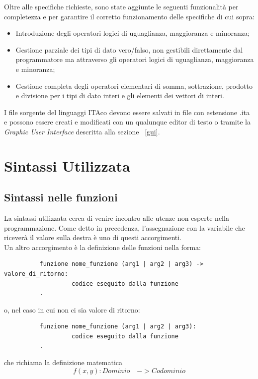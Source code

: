 \documentclass[11pt, a4paper, twoside, notitlepage]{report}
\begin{document}
Oltre alle specifiche richieste, sono state aggiunte le seguenti funzionalità
per completezza e per garantire il corretto funzionamento delle specifiche di
cui sopra:
\begin{itemize}
  \item Introduzione degli operatori logici di uguaglianza, maggioranza e
  minoranza;
  \item Gestione parziale dei tipi di dato vero/falso, non gestibili
  direttamente dal programmatore ma attraverso gli operatori logici di
  uguaglianza, maggioranza e minoranza;
  \item Gestione completa degli operatori elementari di somma, sottrazione,
  prodotto e divisione per i tipi di dato interi e gli elementi dei vettori di
  interi.
\end{itemize}
I file sorgente del linguaggi ITAco devono essere salvati in file con estensione
.ita e possono essere creati e modificati con un qualunque editor di testo o
tramite la \emph{Graphic User Interface} descritta alla sezione ~\ref{gui}.
\section{Sintassi Utilizzata}
\label{sintassi}
\subsection{Sintassi nelle funzioni}
La sintassi utilizzata cerca di venire incontro alle utenze non esperte nella
programmazione. Come detto in precedenza, l'assegnazione con la variabile che
riceverà il valore sulla destra è uno di questi accorgimenti.
\\Un altro accorgimento è la definizione delle funzioni nella forma:


\begin{verbatim}
          funzione nome_funzione (arg1 | arg2 | arg3) -> valore_di_ritorno:
                   codice eseguito dalla funzione
          .
\end{verbatim}

o, nel caso in cui non ci sia valore di ritorno:

\begin{verbatim}
          funzione nome_funzione (arg1 | arg2 | arg3):
                   codice eseguito dalla funzione
          .
\end{verbatim}


che richiama la definizione matematica
\[ f(x,y): Dominio \quad -> Codominio\]
\end{document}
